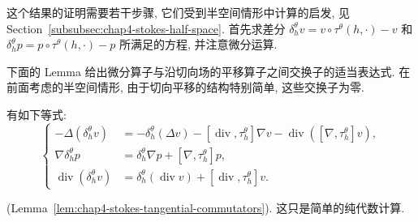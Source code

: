 这个结果的证明需要若干步骤, 它们受到半空间情形中计算的启发, 见 Section~\ref{subsubsec:chap4-stokes-half-space}. 首先求差分 $\delta_h^\theta v=v\circ\tau^\theta(h,\cdot)-v$ 和 $\delta_h^\theta p=p\circ\tau^\theta(h,\cdot)-p$ 所满足的方程, 并注意微分运算.

下面的 Lemma 给出微分算子与沿切向场的平移算子之间交换子的适当表达式. 在前面考虑的半空间情形, 由于切向平移的结构特别简单, 这些交换子为零.

\begin{Lemma}
\label{lem:chap4-stokes-tangential-commutators}
有如下等式:
\begin{equation}
 \left\{
 \begin{aligned}
  -\Delta(\delta_h^\theta v)
  &=-\delta_h^\theta(\Delta v)-[\operatorname{div},\tau_h^\theta]\nabla v
    -\operatorname{div}([\nabla,\tau_h^\theta]v),\\
  \nabla\delta_h^\theta p
  &=\delta_h^\theta\nabla p+[\nabla,\tau_h^\theta]p,\\
  \operatorname{div}(\delta_h^\theta v)
  &=\delta_h^\theta(\operatorname{div}v)+[\operatorname{div},\tau_h^\theta]v.
 \end{aligned}
 \right.
 \label{eq:chap4-stokes-tangential-commutators}
\end{equation}
\end{Lemma}

\begin{Proof}
(Lemma~\ref{lem:chap4-stokes-tangential-commutators}).
这只是简单的纯代数计算.
\end{Proof}

